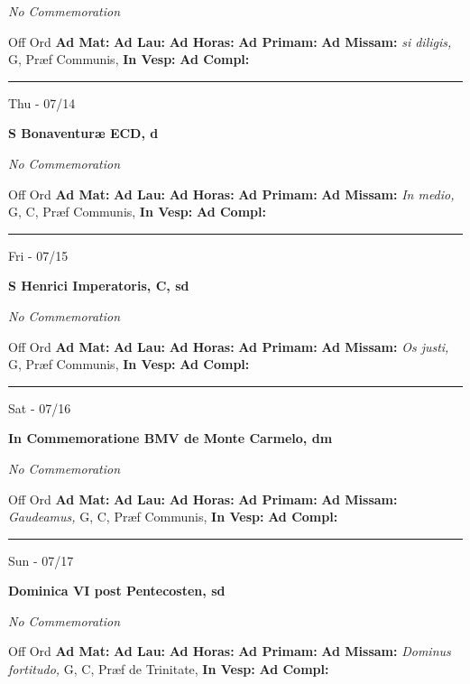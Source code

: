 \documentclass[letterpaper, 10pt]{article}
\begin{document}
\textit{No Commemoration}\begin{justify}
Off Ord
\textbf{Ad Mat: }
\textbf{Ad Lau: }
\textbf{Ad Horas: }
\textbf{Ad Primam: }
\textbf{Ad Missam:} \textit{si diligis, } G, Præf Communis, 
\textbf{In Vesp: }
\textbf{Ad Compl: }\end{justify}



\hrule
\begin{center}
Thu - 07/14
\end{center}\textbf{ \large S Bonaventuræ ECD, \textnormal{\normalsize d}}

\textit{No Commemoration}\begin{justify}
Off Ord
\textbf{Ad Mat: }
\textbf{Ad Lau: }
\textbf{Ad Horas: }
\textbf{Ad Primam: }
\textbf{Ad Missam:} \textit{In medio, } G, C, Præf Communis, 
\textbf{In Vesp: }
\textbf{Ad Compl: }\end{justify}



\hrule
\begin{center}
Fri - 07/15
\end{center}\textbf{ \large S Henrici Imperatoris, C, \textnormal{\normalsize sd}}

\textit{No Commemoration}\begin{justify}
Off Ord
\textbf{Ad Mat: }
\textbf{Ad Lau: }
\textbf{Ad Horas: }
\textbf{Ad Primam: }
\textbf{Ad Missam:} \textit{Os justi, } G, Præf Communis, 
\textbf{In Vesp: }
\textbf{Ad Compl: }\end{justify}



\hrule
\begin{center}
Sat - 07/16
\end{center}\textbf{ \large In Commemoratione BMV de Monte Carmelo, \textnormal{\normalsize dm}}

\textit{No Commemoration}\begin{justify}
Off Ord
\textbf{Ad Mat: }
\textbf{Ad Lau: }
\textbf{Ad Horas: }
\textbf{Ad Primam: }
\textbf{Ad Missam:} \textit{Gaudeamus, } G, C, Præf Communis, 
\textbf{In Vesp: }
\textbf{Ad Compl: }\end{justify}



\hrule
\begin{center}
Sun - 07/17
\end{center}\textbf{ \large Dominica VI post Pentecosten, \textnormal{\normalsize sd}}

\textit{No Commemoration}\begin{justify}
Off Ord
\textbf{Ad Mat: }
\textbf{Ad Lau: }
\textbf{Ad Horas: }
\textbf{Ad Primam: }
\textbf{Ad Missam:} \textit{Dominus fortitudo, } G, C, Præf de Trinitate, 
\textbf{In Vesp: }
\textbf{Ad Compl: }\end{justify}
\end{document}
